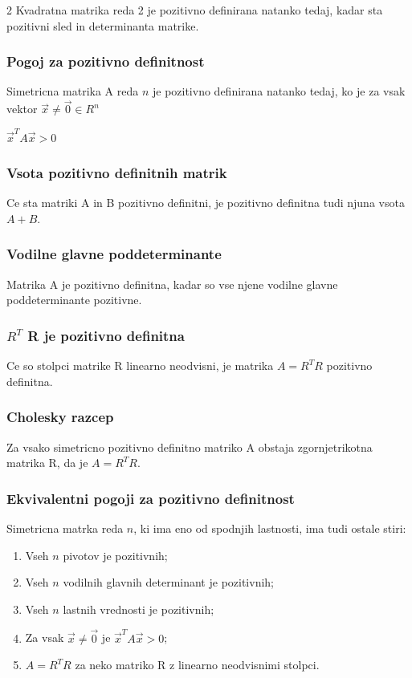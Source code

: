 \documentclass{article}
\begin{document}
\begin{multicols}{2}
	Kvadratna matrika reda 2 je pozitivno definirana natanko tedaj, kadar sta
	pozitivni sled in determinanta matrike.

	\subsubsection{Pogoj za pozitivno definitnost}

	Simetricna matrika A reda $n$ je pozitivno definirana natanko tedaj, ko je za vsak
	vektor $\vec{x} \neq \vec{0} \in R^{n}$
	\begin{center}
		$\vec{x}^{T}A\vec{x} > 0$
	\end{center}

	\subsubsection{Vsota pozitivno definitnih matrik}

	Ce sta matriki A in B pozitivno definitni, je pozitivno definitna tudi
	njuna vsota $A + B$.

	\subsubsection{Vodilne glavne poddeterminante}

	Matrika A je pozitivno definitna, kadar so vse njene vodilne glavne poddeterminante pozitivne.

	\subsubsection{$R^T$ R je pozitivno definitna}

	Ce so stolpci matrike R linearno neodvisni, je matrika $A = R^{T}R$ pozitivno definitna.

	\subsubsection{Cholesky razcep}

	Za vsako simetricno pozitivno definitno matriko A obstaja zgornjetrikotna matrika R, da
	je $A = R^{T}R$.

	\subsubsection{Ekvivalentni pogoji za pozitivno definitnost}

	Simetricna matrka reda $n$, ki ima eno od spodnjih lastnosti, ima tudi ostale stiri:
	\begin{enumerate}
		\item Vseh $n$ pivotov je pozitivnih;
		\item Vseh $n$ vodilnih glavnih determinant je pozitivnih;
		\item Vseh $n$ lastnih vrednosti je pozitivnih;
		\item Za vsak $\vec{x} \neq \vec{0}$ je $\vec{x}^{T}A\vec{x} > 0$;
		\item $A= R^{T}R$ za neko matriko R z linearno neodvisnimi stolpci.
	\end{enumerate}


\end{multicols}
\end{document}
